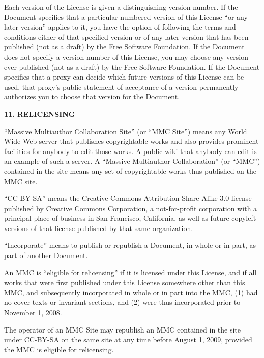 \documentclass[a4paper,11pt,oneside]{book}
\begin{document}
Each version of the License is given a distinguishing version number.
If the Document specifies that a particular numbered version of this
License ``or any later version'' applies to it, you have the option of
following the terms and conditions either of that specified version or
of any later version that has been published (not as a draft) by the
Free Software Foundation.  If the Document does not specify a version
number of this License, you may choose any version ever published (not
as a draft) by the Free Software Foundation.  If the Document
specifies that a proxy can decide which future versions of this
License can be used, that proxy's public statement of acceptance of a
version permanently authorizes you to choose that version for the
Document.


\begin{center}
	{\Large\bf 11. RELICENSING\par}
\end{center}


``Massive Multiauthor Collaboration Site'' (or ``MMC Site'') means any
World Wide Web server that publishes copyrightable works and also
provides prominent facilities for anybody to edit those works.  A
public wiki that anybody can edit is an example of such a server.  A
``Massive Multiauthor Collaboration'' (or ``MMC'') contained in the
site means any set of copyrightable works thus published on the MMC
site.

``CC-BY-SA'' means the Creative Commons Attribution-Share Alike 3.0
license published by Creative Commons Corporation, a not-for-profit
corporation with a principal place of business in San Francisco,
California, as well as future copyleft versions of that license
published by that same organization.

``Incorporate'' means to publish or republish a Document, in whole or
in part, as part of another Document.

An MMC is ``eligible for relicensing'' if it is licensed under this
License, and if all works that were first published under this License
somewhere other than this MMC, and subsequently incorporated in whole
or in part into the MMC, (1) had no cover texts or invariant sections,
and (2) were thus incorporated prior to November 1, 2008.

The operator of an MMC Site may republish an MMC contained in the site
under CC-BY-SA on the same site at any time before August 1, 2009,
provided the MMC is eligible for relicensing.
\end{document}
